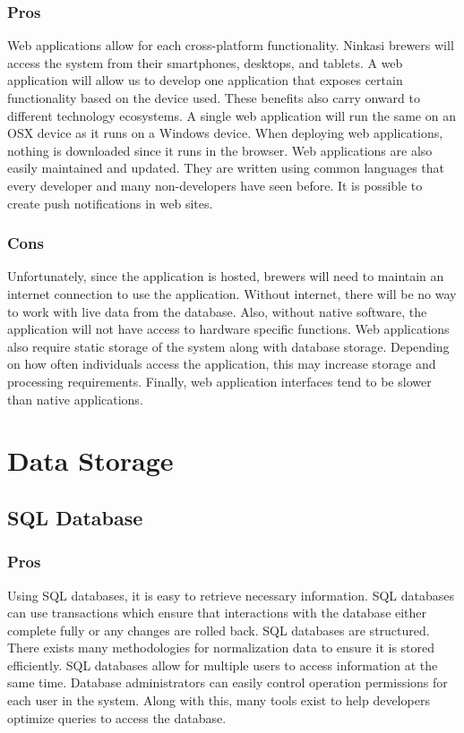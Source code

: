 \documentclass[draftclsnofoot,onecolumn,letterpaper,10pt,compsoc]{IEEEtran}
\begin{document}
        \subsubsection{Pros}
            Web applications allow for each cross-platform functionality.
            Ninkasi brewers will access the system from their smartphones, desktops, and tablets.
            A web application will allow us to develop one application that exposes certain functionality based on the device used.
            These benefits also carry onward to different technology ecosystems.
            A single web application will run the same on an OSX device as it runs on a Windows device.
            When deploying web applications, nothing is downloaded since it runs in the browser.
            Web applications are also easily maintained and updated.
            They are written using common languages that every developer and many non-developers have seen before.
            It is possible to create push notifications in web sites\cite{GooglePushNotifications}.
    
        \subsubsection{Cons}
            Unfortunately, since the application is hosted, brewers will need to maintain an internet connection to use the application.
            Without internet, there will be no way to work with live data from the database.
            Also, without native software, the application will not have access to hardware specific functions.
            Web applications also require static storage of the system along with database storage.
            Depending on how often individuals access the application, this may increase storage and processing requirements.
            Finally, web application interfaces tend to be slower than native applications\cite{LifeWireOverview}.


\section{Data Storage}
	\subsection{SQL Database}
        \subsubsection{Pros}
            Using SQL databases, it is easy to retrieve necessary information.
            SQL databases can use transactions which ensure that interactions with the database either complete fully or any changes are rolled back.
            SQL databases are structured.
            There exists many methodologies for normalization data to ensure it is stored efficiently\cite{TechwallaSQL}.
            SQL databases allow for multiple users to access information at the same time\cite{TechwallaSQLPros}.
            Database administrators can easily control operation permissions for each user in the system.
            Along with this, many tools exist to help developers optimize queries to access the database.
    
\end{document}
